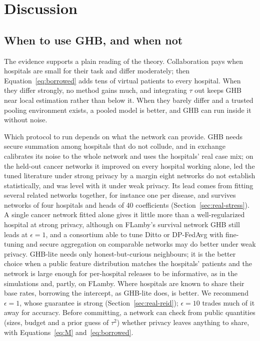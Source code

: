 \documentclass[acmsmall,screen,review]{acmart}
\theoremstyle{acmdefinition}
\begin{document}




\section{Discussion}\label{sec:discussion}

\subsection{When to use GHB, and when not}\label{sec:when}

The evidence supports a plain reading of the theory. Collaboration pays when hospitals are small for their task and differ moderately; then Equation~\eqref{eq:borrowed} adds tens of virtual patients to every hospital. When they differ strongly, no method gains much, and integrating $\tau$ out keeps GHB near local estimation rather than below it. When they barely differ and a trusted pooling environment exists, a pooled model is better, and GHB can run inside it without noise.

Which protocol to run depends on what the network can provide. GHB needs secure summation among hospitals that do not collude, and in exchange calibrates its noise to the whole network and uses the hospitals' real case mix; on the held-out cancer networks it improved on every hospital working alone, led the tuned literature under strong privacy by a margin eight networks do not establish statistically, and was level with it under weak privacy. Its lead comes from fitting several related networks together, for instance one per disease, and survives networks of four hospitals and heads of 40 coefficients (Section~\ref{sec:real-stress}). A single cancer network fitted alone gives it little more than a well-regularized hospital at strong privacy, although on FLamby's survival network GHB still leads at $\epsilon=1$, and a consortium able to tune Ditto \cite{li2021ditto} or DP-FedAvg \cite{mcmahan2018learning} with fine-tuning and secure aggregation on comparable networks may do better under weak privacy. GHB-lite needs only honest-but-curious neighbours; it is the better choice when a public feature distribution matches the hospitals' patients and the network is large enough for per-hospital releases to be informative, as in the simulations and, partly, on FLamby. Where hospitals are known to share their base rates, borrowing the intercept, as GHB-lite does, is better. We recommend $\epsilon=1$, whose guarantee is strong (Section~\ref{sec:real-reid}); $\epsilon=10$ trades much of it away for accuracy. Before committing, a network can check from public quantities (sizes, budget and a prior guess of $\tau^2$) whether privacy leaves anything to share, with Equations~\eqref{eq:M} and~\eqref{eq:borrowed}.
\end{document}
